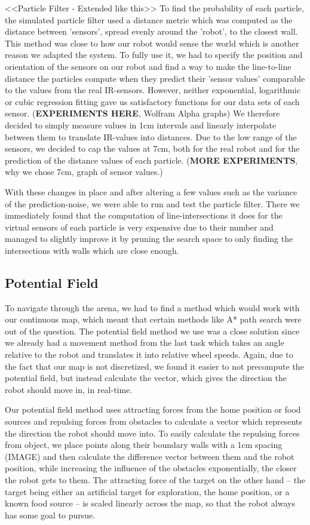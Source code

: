 \documentclass[paper=a4, fontsize=12pt]{scrartcl}	%
\numberwithin{equation}{section}		%
\numberwithin{figure}{section}			%
\numberwithin{table}{section}				%
\begin{document}
<<Particle Filter  - Extended like this>>
To find the probability of each particle, the simulated particle filter used a distance metric which was computed as the distance between 'sensors', spread evenly around the 'robot', to the closest wall. This method was close to how our robot would sense the world which is another reason we adapted the system. To fully use it, we had to specify the position and orientation of the sensors on our robot and find a way to make the line-to-line distance the particles compute when they predict their 'sensor values' comparable to the values from the real IR-sensors.  However, neither exponential, logarithmic or cubic regression fitting gave us satisfactory functions for our data sets of each sensor. (\textbf{EXPERIMENTS HERE}, Wolfram Alpha graphs) We therefore decided to simply measure values in 1cm intervals and linearly interpolate between them to translate IR-values into distances. Due to the low range of the sensors, we decided to cap the values at 7cm, both for the real robot and for the prediction of the distance values of each particle. (\textbf{MORE EXPERIMENTS}, why we chose 7cm, graph of sensor values.)

With these changes in place and after altering a few values such as the variance of the prediction-noise, we were able to run and test the particle filter. There we immediately found that the computation of line-intersections it does for the virtual sensors of each particle is very expensive due to their number and managed to slightly improve it by pruning the search space to only finding the intersections with walls which are close enough.

\subsection{Potential Field}
To navigate through the arena, we had to find a method which would work with our continuous map, which meant that certain methods like A* path search were out of the question. The potential field method we use was a close solution since we already had a movement method from the last task which takes an angle relative to the robot and translates it into relative wheel speeds. Again, due to the fact that our map is not discretized, we found it easier to not precompute the potential field, but instead calculate the vector, which gives the direction the robot should move in, in real-time.

Our potential field method uses attracting forces from the home position or food sources and repulsing forces from obstacles to calculate a vector which represents the direction the robot should move into. To easily calculate the repulsing forces from object, we place points along their boundary walls with a 1cm spacing (IMAGE) and then calculate the difference vector between them and the robot position, while increasing the influence of the obstacles exponentially, the closer the robot gets to them. The attracting force of the target on the other hand – the target being either an artificial target for exploration, the home position, or a known food source – is scaled linearly across the map, so that the robot always has some goal to pursue. 
\end{document}
